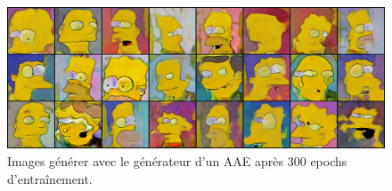 \documentclass[11pt,francais]{article}
\begin{document}
\begin{figure}[!h]
    \centering
    \includegraphics[width=\textwidth]{Figures/resultats_simpsons/AAE_300.png}
    \caption{Images générer avec le générateur d'un AAE après 300 epochs d'entraînement.}
    \label{fig:fig6}
\end{figure}
\end{document}
